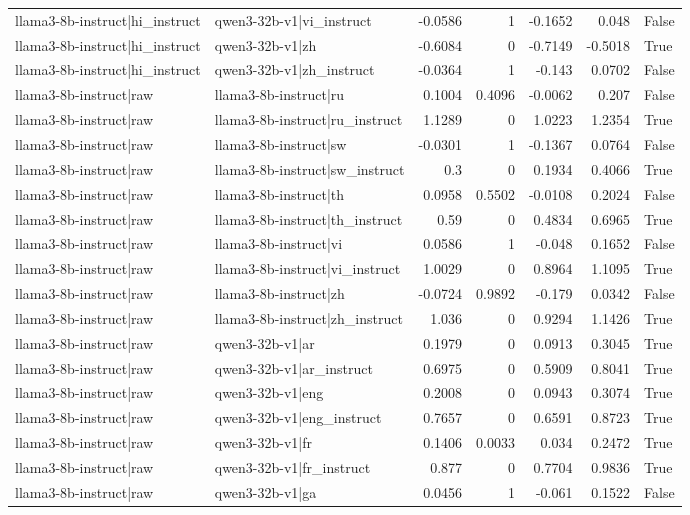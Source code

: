 \begin{table}
\begin{tabular}{l l r r r r l}
llama3-8b-instruct|hi_instruct & qwen3-32b-v1|vi_instruct & -0.0586 & 1 & -0.1652 & 0.048 & False \\
llama3-8b-instruct|hi_instruct & qwen3-32b-v1|zh & -0.6084 & 0 & -0.7149 & -0.5018 & True \\
llama3-8b-instruct|hi_instruct & qwen3-32b-v1|zh_instruct & -0.0364 & 1 & -0.143 & 0.0702 & False \\
llama3-8b-instruct|raw & llama3-8b-instruct|ru & 0.1004 & 0.4096 & -0.0062 & 0.207 & False \\
llama3-8b-instruct|raw & llama3-8b-instruct|ru_instruct & 1.1289 & 0 & 1.0223 & 1.2354 & True \\
llama3-8b-instruct|raw & llama3-8b-instruct|sw & -0.0301 & 1 & -0.1367 & 0.0764 & False \\
llama3-8b-instruct|raw & llama3-8b-instruct|sw_instruct & 0.3 & 0 & 0.1934 & 0.4066 & True \\
llama3-8b-instruct|raw & llama3-8b-instruct|th & 0.0958 & 0.5502 & -0.0108 & 0.2024 & False \\
llama3-8b-instruct|raw & llama3-8b-instruct|th_instruct & 0.59 & 0 & 0.4834 & 0.6965 & True \\
llama3-8b-instruct|raw & llama3-8b-instruct|vi & 0.0586 & 1 & -0.048 & 0.1652 & False \\
llama3-8b-instruct|raw & llama3-8b-instruct|vi_instruct & 1.0029 & 0 & 0.8964 & 1.1095 & True \\
llama3-8b-instruct|raw & llama3-8b-instruct|zh & -0.0724 & 0.9892 & -0.179 & 0.0342 & False \\
llama3-8b-instruct|raw & llama3-8b-instruct|zh_instruct & 1.036 & 0 & 0.9294 & 1.1426 & True \\
llama3-8b-instruct|raw & qwen3-32b-v1|ar & 0.1979 & 0 & 0.0913 & 0.3045 & True \\
llama3-8b-instruct|raw & qwen3-32b-v1|ar_instruct & 0.6975 & 0 & 0.5909 & 0.8041 & True \\
llama3-8b-instruct|raw & qwen3-32b-v1|eng & 0.2008 & 0 & 0.0943 & 0.3074 & True \\
llama3-8b-instruct|raw & qwen3-32b-v1|eng_instruct & 0.7657 & 0 & 0.6591 & 0.8723 & True \\
llama3-8b-instruct|raw & qwen3-32b-v1|fr & 0.1406 & 0.0033 & 0.034 & 0.2472 & True \\
llama3-8b-instruct|raw & qwen3-32b-v1|fr_instruct & 0.877 & 0 & 0.7704 & 0.9836 & True \\
llama3-8b-instruct|raw & qwen3-32b-v1|ga & 0.0456 & 1 & -0.061 & 0.1522 & False \\

\end{tabular}
\end{table}
